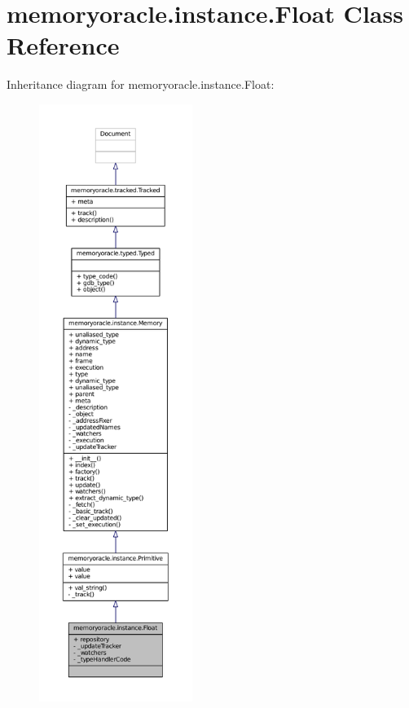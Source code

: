 \hypertarget{classmemoryoracle_1_1instance_1_1Float}{}\section{memoryoracle.\+instance.\+Float Class Reference}
\label{classmemoryoracle_1_1instance_1_1Float}


Inheritance diagram for memoryoracle.\+instance.\+Float\+:
\nopagebreak
\begin{figure}[H]
\begin{center}
\leavevmode
\includegraphics[height=550pt]{classmemoryoracle_1_1instance_1_1Float__inherit__graph}
\end{center}
\end{figure}


